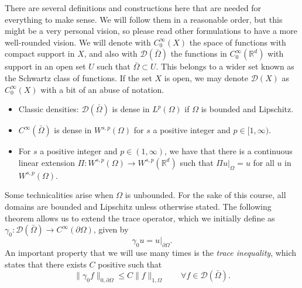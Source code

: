 \documentclass{article}
\newcommand{\R}{\mathbb{R}}
\newcommand{\D}{\mathcal{D}}
\begin{document}
There are several definitions and constructions here that are needed for everything to make sense. We will follow them in a reasonable order, but this might be a very personal vision, so please read other formulations to have a more well-rounded vision. We will denote with $C_0^\infty(X)$ the space of functions with compact support in $X$, and also with $\D(\bar\Omega)$ the functions in $C_0^\infty(\R^d)$ with support in an open set $U$ such that $\bar\Omega\subset U$. This belongs to a wider set known as the Schwartz class of functions. If the set $X$ is open, we may denote $\D(X)$ as $C_0^\infty(X)$ with a bit of an abuse of notation.

\begin{itemize}
    \item Classic densities: $\D(\bar\Omega)$ is dense in $L^p(\Omega)$ if $\Omega$ is bounded and Lipschitz.
    \item $C^\infty(\bar\Omega)$ is dense in $W^{s,p}(\Omega)$ for $s$ a positive integer and $p\in [1,\infty)$.
    \item For $s$ a positive integer and $p\in (1,\infty)$, we have that there is a continuous linear extension $\Pi: W^{s,p}(\Omega) \to W^{s,p}(\R^d)$ such that $\Pi u|_\Omega = u$ for all $u$ in $W^{s,p}(\Omega)$.
\end{itemize}

Some technicalities arise when $\Omega$ is unbounded. For the sake of this course, all domains are bounded and Lipschitz unless otherwise stated. The following theorem allows us to extend the trace operator, which we initially define as $\gamma_0: \D(\bar\Omega) \to C^\infty(\partial\Omega)$, given by
    $$ \gamma_0 u = u|_{\partial\Omega}.$$
An important property that we will use many times is the \emph{trace inequality}, which states that there exists $C$ positive such that 
    $$ \| \gamma_0 f \|_{0,\partial\Omega} \leq C \| f \|_{1,\Omega} \qquad\forall f \in \mathcal D(\bar\Omega). $$
\end{document}
